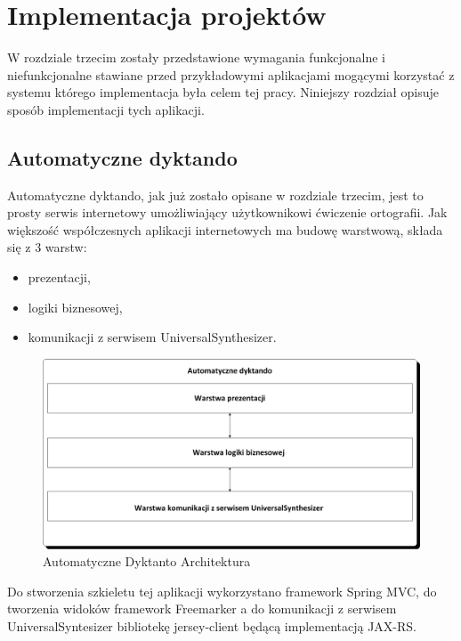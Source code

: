 
\chapter{Implementacja projektów} %



\ifpdf
    \graphicspath{{5/figures/PNG/}{5/figures/PDF/}{5/figures/}}
\else
    \graphicspath{{5/figures/EPS/}{5/figures/}}
\fi



W rozdziale trzecim zostały przedstawione wymagania funkcjonalne i niefunkcjonalne stawiane przed przykładowymi aplikacjami mogącymi korzystać z systemu którego implementacja była celem tej pracy. Niniejszy rozdział opisuje sposób implementacji tych aplikacji.
\section{Automatyczne dyktando}
Automatyczne dyktando, jak już zostało opisane w rozdziale trzecim, jest to prosty serwis internetowy umożliwiający użytkownikowi ćwiczenie ortografii. Jak większość współczesnych aplikacji internetowych ma budowę warstwową, składa się z 3 warstw:
\begin{itemize}
	\item prezentacji,
	\item logiki biznesowej,
	\item komunikacji z serwisem UniversalSynthesizer.
\end{itemize}
\begin{figure}[!h]
	\centering
	\includegraphics[scale=0.45]{automatyczneDyktandoArchitektura.png} 
	\caption{Automatyczne Dyktanto Architektura}
\end{figure}
Do stworzenia szkieletu tej aplikacji wykorzystano framework Spring MVC, do tworzenia widoków framework Freemarker a do komunikacji z serwisem UniversalSyntesizer bibliotekę jersey-client będącą implementacją JAX-RS. 
\newpage
